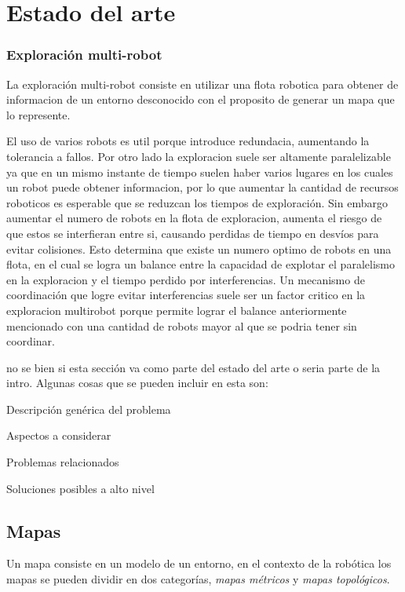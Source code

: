 \section{Estado del arte}

\subsubsection{Exploración multi-robot}
La exploración multi-robot consiste en utilizar una flota robotica para obtener de informacion de un entorno desconocido con el proposito de generar un mapa que lo represente. 

El uso de varios robots es util porque introduce redundacia, aumentando la tolerancia a fallos. Por otro lado la exploracion suele ser altamente paralelizable ya que en un mismo instante de tiempo suelen haber varios lugares en los cuales un robot puede obtener informacion, por lo que aumentar la cantidad de recursos roboticos es esperable que se reduzcan los tiempos de exploración\cite {cao1997cooperative}\cite{dudek1996taxonomy}\cite{guzzoni1997many}. Sin embargo aumentar el numero de robots en la flota de exploracion, aumenta el riesgo de que estos se interfieran entre si, causando perdidas de tiempo en desvíos para evitar colisiones\cite{guzzoni1997many}\cite{goldberg1997interference}. Esto determina que existe un numero optimo de robots en una flota, en el cual se logra un balance entre la capacidad de explotar el paralelismo en la exploracion y el tiempo perdido por interferencias. Un mecanismo de coordinación que logre evitar interferencias suele ser un factor critico en la exploracion multirobot porque permite lograr el balance anteriormente mencionado con una cantidad de robots mayor al que se podria tener sin coordinar\cite{nieto2014coordination}.

no se bien si esta sección va como parte del estado del arte o seria parte de la intro. Algunas cosas que se pueden incluir en esta son:

  Descripción genérica del problema

  Aspectos a considerar

  Problemas relacionados

  Soluciones posibles a alto nivel

\subsection{Mapas}\cite{Liu2015}\cite{Thrun1998}
Un mapa consiste en un modelo de un entorno, en el contexto de la robótica los mapas se pueden dividir en dos categorías, \emph{mapas métricos} y \emph{mapas topológicos}.

